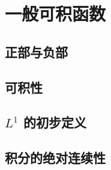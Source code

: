 \section{一般可积函数}
\label{b1:sec:0502}


\subsection{正部与负部}
\label{b1:subsec:050201}

\subsection{可积性}
\label{b1:subsec:050202}

\subsection{\texorpdfstring{\(L^1\)}{L1} 的初步定义}
\label{b1:subsec:050203}

\subsection{积分的绝对连续性}
\label{b1:subsec:050204}


